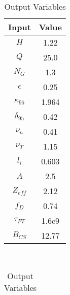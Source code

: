 \begin{table}[b!]
\centering
\caption{ACT II Variables}
\hfill
\begin{subtable}[t]{0.4\textwidth}
\centering
\caption{Input Variables} ~\\
\begin{tabular}{ c|c }

Input            & Value           \\
\hline
$H$              & 1.22            \\
$Q$              & 25.0            \\
$N_{G}$          & 1.3             \\
$\epsilon$       & 0.25            \\
$\kappa_{95}$    & 1.964           \\
$\delta_{95}$    & 0.42            \\
$\nu_{n}$        & 0.41            \\
$\nu_{T}$        & 1.15            \\
$l_{i}$          & 0.603         \\
$A$              & 2.5             \\
$Z_{eff}$        & 2.12            \\
$f_{D}$          & 0.74            \\
$\tau_{FT}$      & 1.6e9           \\
$B_{CS}$         & 12.77           \\

\end{tabular}
\end{subtable}
\hfill
\begin{subtable}[t]{0.5\textwidth}
\centering
\caption{Output Variables} ~\\
\begin{tabular}{ c|c|c }


\end{tabular}
\end{subtable}
\end{table}
